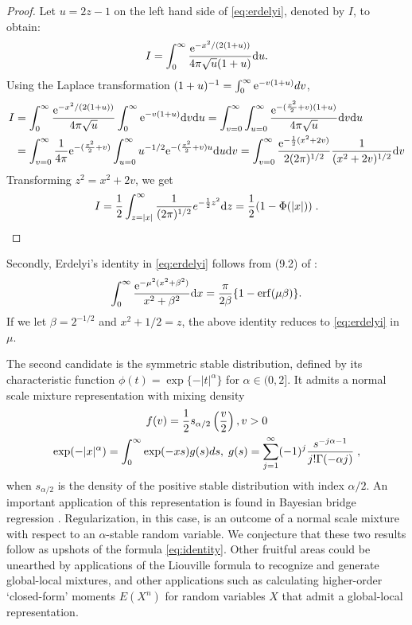\documentclass[lineno]{biometrika}
\begin{document}
\begin{proof}
Let $ u = 2z-1$ on the left hand side of \eqref{eq:erdelyi}, denoted by $I$, to obtain: 
$$
I = \int_{0}^{\infty} \frac{{\rm e}^{-x^2/(2(1+u))}}{4 \pi \sqrt{u} (1+u)} {\rm d} u.
$$
Using the Laplace transformation $(1+u)^{-1} = \int_0^{\infty} {\rm e}^{-v(1+u)} dv$, 
\begin{align*}
  I & = \int_{0}^{\infty} \frac{{\rm e}^{-x^2/(2(1+u))}}{4 \pi \sqrt{u}} 
  \int_0^{\infty} {\rm e}^{-v(1+u)} {\rm d} v {\rm d} u 
  = \int_{v= 0}^{\infty} \int_{u=0}^{\infty} 
  \frac{{\rm e}^{-(\frac{x^2}{2} + v)(1+u)}}{4 \pi \sqrt{u}} {\rm d} v {\rm d} u \\
  & = \int_{v= 0}^{\infty} \frac{1}{4\pi} {\rm e}^{-(\frac{x^2}{2} + v)} 
  \int_{u=0}^{\infty} u^{-1/2} {\rm e}^{-(\frac{x^2}{2} + v) u} {\rm d} u {\rm d} v 
  = \int_{v= 0}^{\infty} \frac{ {\rm e}^{-\frac{1}{2}(x^2 + 2v)}}{2 (2\pi)^{1/2}} 
  \frac{1}{(x^2+ 2v)^{1/2}} {\rm d} v\\
\end{align*}
Transforming $z^2 = x^2 + 2v$, we get 
$$
I =\frac{1}{2}  \int_{z = |x|}^{\infty} \frac{1}{(2\pi)^{1/2}} e^{-\frac{1}{2} z^2} {\rm d} z 
= \frac{1}{2} (1 - \Phi(|x|))
\;.
$$
\end{proof}
Secondly, Erdelyi's identity in \eqref{eq:erdelyi} follows from (9.2) of
\cite{amdeberhan_cauchy-schlomilch_2010}: 
$$
\int_0^{\infty}\frac{{\rm e}^{-\mu^2(x^2+\beta^2)}}{x^2+\beta^2} {\rm d} x 
= \frac{\pi}{2 \beta} \{ 1 - {\rm erf}(\mu \beta) \}.
$$
If we let $\beta = 2^{-1/2}$ and $x^2+1/2 = z$, the above identity reduces to
\eqref{eq:erdelyi} in $\mu$. 

The second candidate is the symmetric stable distribution, defined by its
characteristic function $\phi(t) = \exp\{ -|t|^{\alpha} \}$ for $\alpha \in (0,2]$.  
It admits a normal scale mixture representation with mixing density 
\begin{gather*}
  f(v) = \frac{1}{2} s_{\alpha/2} \left( \frac{v}{2} \right), v > 0 
  \\
  \exp(-|x|^\alpha) = \int_0^{\infty} \exp(-xs) g(s) ds, \; g(s) 
  = \sum_{j=1}^{\infty} (-1)^j \frac{s^{-j\alpha-1}}{j! \Gamma(-\alpha j)}
  \;,
\end{gather*}
when $s_{\alpha/2}$ is the density of the positive stable distribution with index 
$\alpha / 2$.  An important application of this representation is found in
Bayesian bridge regression \citep{polson_bayesian_2014}.  Regularization, in this
case, is an outcome of a normal scale mixture with respect to an
$\alpha$-stable random variable.  We conjecture that these two results follow
as upshots of the \CS{} formula \eqref{eq:identity}. Other fruitful areas could
be unearthed by applications of the Liouville formula to recognize and generate
global-local mixtures, and other applications such as calculating higher-order
`closed-form' moments $E(X^n)$ for random variables $X$ that admit a
global-local representation. 



\end{document}
